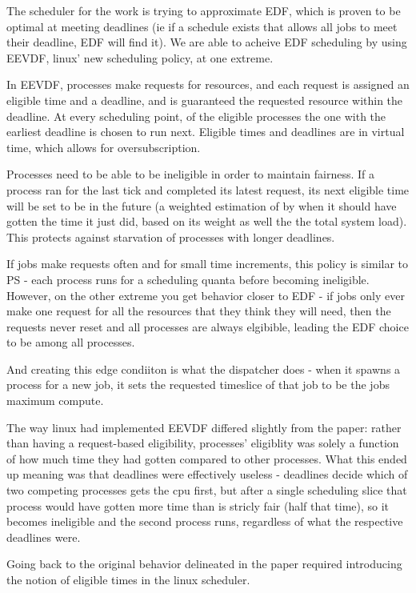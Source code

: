 The scheduler for the work is trying to approximate EDF, which is proven to be
optimal at meeting deadlines (ie if a schedule exists that allows all jobs to
meet their deadline, EDF will find it). We are able to acheive EDF scheduling by
using EEVDF, linux' new scheduling policy, at one extreme.

In EEVDF, processes make requests for resources, and each request is assigned an
eligible time and a deadline, and is guaranteed the requested resource within
the deadline. At every scheduling point, of the eligible processes the one with
the earliest deadline is chosen to run next. Eligible times and deadlines are in
virtual time, which allows for oversubscription. 

Processes need to be able to be ineligible in order to maintain fairness. If a
process ran for the last tick and completed its latest request, its next
eligible time will be set to be in the future (a weighted estimation of by when
it should have gotten the time it just did, based on its weight as well the the
total system load). This protects against starvation of processes with longer
deadlines.

If jobs make requests often and for small time increments, this policy is
similar to PS - each process runs for a scheduling quanta before becoming
ineligible. However, on the other extreme you get behavior closer to EDF - if
jobs only ever make one request for all the resources that they think they will
need, then the requests never reset and all processes are always elgibible,
leading the EDF choice to be among all processes.

And creating this edge condiiton is what the dispatcher does - when it spawns a
process for a new job, it sets the requested timeslice of that job to be the
jobs maximum compute. 

The way linux had implemented EEVDF differed slightly from the paper: rather
than having a request-based eligibility, processes' eligiblity was solely a
function of how much time they had gotten compared to other processes. What this
ended up meaning was that deadlines were effectively useless - deadlines decide
which of two competing processes gets the cpu first, but after a single
scheduling slice that process would have gotten more time than is stricly fair
(half that time), so it becomes ineligible and the second process runs,
regardless of what the respective deadlines were. 

Going back to the original behavior delineated in the paper required introducing
the notion of eligible times in the linux scheduler. 
